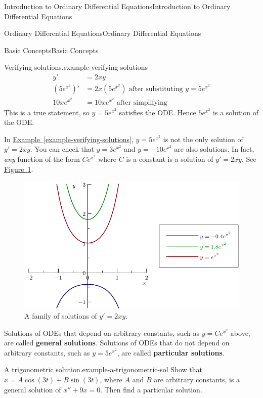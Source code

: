 \documentclass[10pt,]{book}
\newcommand{\terminology}[1]{\textbf{#1}}
\numberwithin{equation}{section}
\begin{document}
\begin{chapterptx}{Introduction to Ordinary Differential Equations}{}{Introduction to Ordinary Differential Equations}{}{}
\begin{sectionptx}{Ordinary Differential Equations}{}{Ordinary Differential Equations}{}{}
\begin{subsectionptx}{Basic Concepts}{}{Basic Concepts}{}{}
\begin{example}{Verifying solutions.}{example-verifying-solutions}
\begin{align*}
y' & = 2xy \\
(5e^{x^{2}})' & = 2x(5e^{x^{2}}) \text{ after substituting }y = 5e^{x^{2}}\\
10xe^{x^{2}} & = 10xe^{x^{2}} \text{ after simplifying} 
\end{align*}
This is a true statement, so \(y = 5e^{x^{2}}\) satisfies the ODE. Hence \(5e^{x^{2}}\) is a solution of the ODE.%
\end{example}
\hypertarget{p-14}{}%
In \hyperref[example-verifying-solutions]{Example~\ref{example-verifying-solutions}}, \(y = 5e^{x^{2}}\) is not the only solution of \(y' = 2xy\). You can check that \(y = 3e^{x^{2}}\) and \(y = -10e^{x^{2}}\) are also solutions. In fact, \emph{any} function of the form \(Ce^{x^{2}}\) where \(C\) is a constant is a solution of \(y' = 2xy\). See \hyperref[figure-family-of-solutions]{Figure~\ref{figure-family-of-solutions}}.%
\begin{figure}
\centering
\includegraphics[width=1\linewidth]{images/image-1.pdf}
\caption{A family of solutions of \(y' = 2xy\).\label{figure-family-of-solutions}}
\end{figure}
\hypertarget{p-15}{}%
Solutions of ODEs that depend on arbitrary constants, such as \(y = Ce^{x^{2}}\) above, are called \terminology{general solutions}. Solutions of ODEs that do not depend on arbitrary constants, such as \(y = 5e^{x^{2}}\), are called \terminology{particular solutions}.%
\begin{example}{A trigonometric solution.}{example-a-trigonometric-sol}%
\hypertarget{p-16}{}%
Show that \(x = A\cos(3t) + B\sin(3t)\), where \(A\) and \(B\) are arbitrary constants, is a general solution of \(x'' + 9x = 0\). Then find a particular solution.%
\par\smallskip%

\end{example}
\end{subsectionptx}
\end{sectionptx}
\end{chapterptx}
\end{document}
